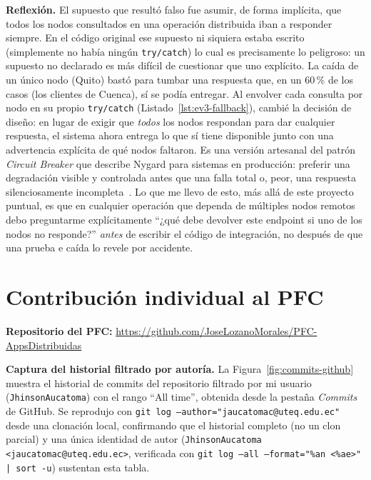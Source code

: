 \documentclass[11pt]{article}
\begin{document}
    \noindent\textbf{Reflexión.}
    El supuesto que resultó falso fue asumir, de forma implícita, que todos los nodos consultados en una operación distribuida iban a responder siempre. En el código original
    ese supuesto ni siquiera estaba escrito (simplemente no había ningún \texttt{try/catch}) lo cual es precisamente lo peligroso: un supuesto no declarado es más difícil de
    cuestionar que uno explícito. La caída de un único nodo (Quito) bastó para tumbar una respuesta que, en un 60\,\% de los casos (los clientes de Cuenca), sí se podía entregar.
    Al envolver cada consulta por nodo en su propio \texttt{try/catch} (Listado~\ref{lst:ev3-fallback}), cambié la decisión de diseño: en lugar de exigir que \emph{todos} los nodos
    respondan para dar cualquier respuesta, el sistema ahora entrega lo que sí tiene disponible junto con una advertencia explícita de qué nodos faltaron. Es una versión artesanal
    del patrón \emph{Circuit Breaker} que describe Nygard para sistemas en producción: preferir una degradación visible y controlada antes que una falla total o, peor, una respuesta
    silenciosamente incompleta~\cite{nygard2018releaseit}. Lo que me llevo de esto, más allá de este proyecto puntual, es que en cualquier operación que dependa de múltiples nodos remotos
    debo preguntarme explícitamente ``¿qué debe devolver este endpoint si uno de los nodos no responde?'' \emph{antes} de escribir el código de integración, no después de que una prueba
    e caída lo revele por accidente.

    \section{Contribución individual al PFC}

    \noindent\textbf{Repositorio del PFC:} {\footnotesize\url{https://github.com/JoseLozanoMorales/PFC-AppsDistribuidas}}

    \noindent\textbf{Captura del historial filtrado por autoría.} La Figura~\ref{fig:commits-github} muestra el historial de commits del repositorio filtrado por mi usuario (\texttt{JhinsonAucatoma}) con el rango ``All time'', obtenida desde la pestaña \emph{Commits} de GitHub. Se reprodujo con \texttt{git log --author="jaucatomac@uteq.edu.ec"} desde una clonación local, confirmando que el historial completo (no un clon parcial) y una única identidad de autor (\texttt{JhinsonAucatoma <jaucatomac@uteq.edu.ec>}, verificada con \texttt{git log --all --format="\%an <\%ae>" | sort -u}) sustentan esta tabla.
\end{document}
